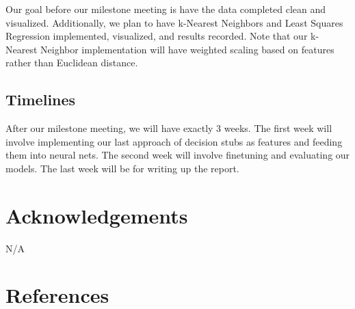 \documentclass{article}
\begin{document}
\begin{multicols}{2}
Our goal before our milestone meeting is have the data completed clean and visualized. Additionally, we plan to have k-Nearest Neighbors and Least Squares Regression implemented, visualized, and results recorded. Note that our k-Nearest Neighbor implementation will have weighted scaling based on features rather than Euclidean distance.

\subsection{Timelines}

After our milestone meeting, we will have exactly 3 weeks. The first week will involve implementing our last approach of decision stubs as features and feeding them into neural nets. The second week will involve finetuning and evaluating our models. The last week will be for writing up the report.

\section{Acknowledgements} N/A

\end{multicols}

\pagebreak

\section{References} \theendnotes
\end{document}
